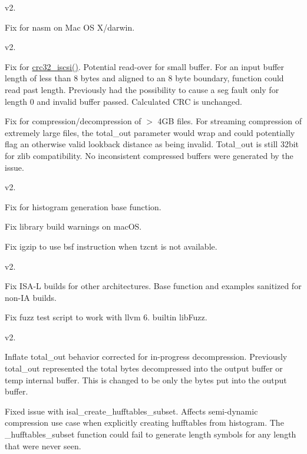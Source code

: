 v2.


\begin{DoxyItemize}
\item Fix for nasm on Mac O\-S X/darwin.
\end{DoxyItemize}

v2.


\begin{DoxyItemize}
\item Fix for \hyperlink{crc_8h_abdf5fc84c01b815d8416028020e04cdd}{crc32\-\_\-iscsi()}. Potential read-\/over for small buffer. For an input buffer length of less than 8 bytes and aligned to an 8 byte boundary, function could read past length. Previously had the possibility to cause a seg fault only for length 0 and invalid buffer passed. Calculated C\-R\-C is unchanged.
\item Fix for compression/decompression of $>$ 4\-G\-B files. For streaming compression of extremely large files, the total\-\_\-out parameter would wrap and could potentially flag an otherwise valid lookback distance as being invalid. Total\-\_\-out is still 32bit for zlib compatibility. No inconsistent compressed buffers were generated by the issue.
\end{DoxyItemize}

v2.


\begin{DoxyItemize}
\item Fix for histogram generation base function.
\item Fix library build warnings on mac\-O\-S.
\item Fix igzip to use bsf instruction when tzcnt is not available.
\end{DoxyItemize}

v2.


\begin{DoxyItemize}
\item Fix I\-S\-A-\/\-L builds for other architectures. Base function and examples sanitized for non-\/\-I\-A builds.
\item Fix fuzz test script to work with llvm 6. builtin lib\-Fuzz.
\end{DoxyItemize}

v2.


\begin{DoxyItemize}
\item Inflate total\-\_\-out behavior corrected for in-\/progress decompression. Previously total\-\_\-out represented the total bytes decompressed into the output buffer or temp internal buffer. This is changed to be only the bytes put into the output buffer.
\item Fixed issue with isal\-\_\-create\-\_\-hufftables\-\_\-subset. Affects semi-\/dynamic compression use case when explicitly creating hufftables from histogram. The \-\_\-hufftables\-\_\-subset function could fail to generate length symbols for any length that were never seen.
\end{DoxyItemize}

